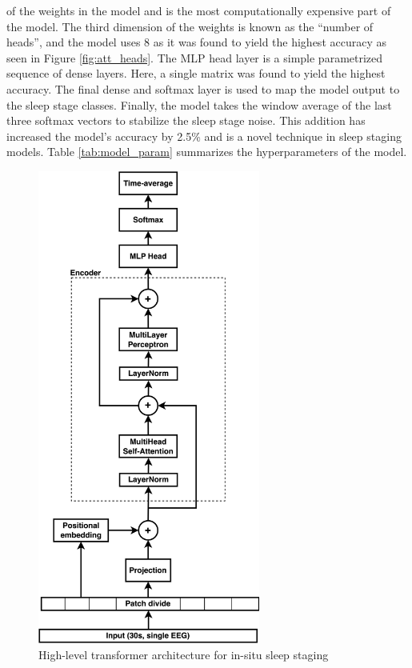 \documentclass[12pt, hidelinks]{article}
\begin{document}
of the weights in the model and is the most computationally expensive part of the model. The third dimension of the weights is known as the ``number of heads'', and the model uses 8
as it was found to yield the highest accuracy as seen in Figure \ref{fig:att_heads}. The MLP head layer is a simple parametrized sequence of dense layers. Here, a single matrix was found
to yield the highest accuracy. The final dense and softmax layer is used to map the model output to the sleep stage classes. Finally, the model takes the window average of the last
three softmax vectors to stabilize the sleep stage noise. This addition has increased the model's accuracy by 2.5\% and is a novel technique in sleep staging models. Table
\ref{tab:model_param} summarizes the hyperparameters of the model.

\begin{figure}
    \centering
    \caption{High-level transformer architecture for in-situ sleep staging}
    \includegraphics[width=0.65\textwidth]{assets/ViT.png}
\end{figure}
\label{fig:vit}
\end{document}
